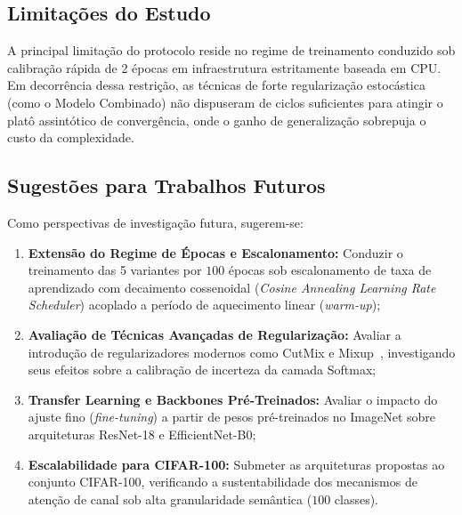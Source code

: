 \documentclass[runningheads]{llncs}
\begin{document}
\subsection{Limita\c{c}\~{o}es do Estudo}
A principal limita\c{c}\~{a}o do protocolo reside no regime de treinamento conduzido sob calibra\c{c}\~{a}o r\'{a}pida de 2 \'{e}pocas em infraestrutura estritamente baseada em CPU. Em decorr\^{e}ncia dessa restri\c{c}\~{a}o, as t\'{e}cnicas de forte regulariza\c{c}\~{a}o estoc\'{a}stica (como o Modelo Combinado) n\~{a}o dispuseram de ciclos suficientes para atingir o plat\^{o} assint\'{o}tico de converg\^{e}ncia, onde o ganho de generaliza\c{c}\~{a}o sobrepuja o custo da complexidade.

\subsection{Sugest\~{o}es para Trabalhos Futuros}
Como perspectivas de investiga\c{c}\~{a}o futura, sugerem-se:
\begin{enumerate}
    \item \textbf{Extens\~{a}o do Regime de \'{E}pocas e Escalonamento:} Conduzir o treinamento das 5 variantes por $100$ \'{e}pocas sob escalonamento de taxa de aprendizado com decaimento cossenoidal (\textit{Cosine Annealing Learning Rate Scheduler}) acoplado a per\'{i}odo de aquecimento linear (\textit{warm-up});
    \item \textbf{Avalia\c{c}\~{a}o de T\'{e}cnicas Avan\c{c}adas de Regulariza\c{c}\~{a}o:} Avaliar a introdu\c{c}\~{a}o de regularizadores modernos como CutMix e Mixup~\cite{zhang2018mixup}, investigando seus efeitos sobre a calibra\c{c}\~{a}o de incerteza da camada Softmax;
    \item \textbf{Transfer Learning e Backbones Pr\'{e}-Treinados:} Avaliar o impacto do ajuste fino (\textit{fine-tuning}) a partir de pesos pr\'{e}-treinados no ImageNet sobre arquiteturas ResNet-18 e EfficientNet-B0;
    \item \textbf{Escalabilidade para CIFAR-100:} Submeter as arquiteturas propostas ao conjunto CIFAR-100, verificando a sustentabilidade dos mecanismos de aten\c{c}\~{a}o de canal sob alta granularidade sem\^{a}ntica ($100$ classes).
\end{enumerate}



\end{document}
